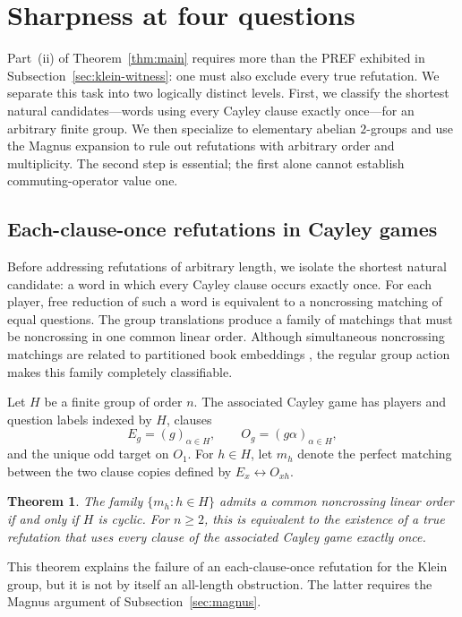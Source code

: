\documentclass[11pt]{article}
\newtheorem{theorem}{Theorem}[section]
\theoremstyle{definition}
\theoremstyle{remark}
\numberwithin{equation}{section}
\begin{document}
\section{Sharpness at four questions}\label{sec:sharpness}

Part~(ii) of Theorem~\ref{thm:main} requires more than the PREF exhibited in
Subsection~\ref{sec:klein-witness}: one must also exclude every true refutation.
We separate this task into two logically distinct levels.  First, we classify
the shortest natural candidates---words using every Cayley clause exactly
once---for an arbitrary finite group.  We then specialize to elementary
abelian \(2\)-groups and use the Magnus expansion to rule out refutations with
arbitrary order and multiplicity.  The second step is essential; the first
alone cannot establish commuting-operator value one.

\subsection{Each-clause-once refutations in Cayley games}\label{sec:cayley}

Before addressing refutations of arbitrary length, we isolate the shortest
natural candidate: a word in which every Cayley clause occurs exactly once.
For each player, free reduction of such a word is equivalent to a
noncrossing matching of equal questions.  The group translations produce a
family of matchings that must be noncrossing in one common linear order.
Although simultaneous noncrossing matchings are related to partitioned book
embeddings \cite{AkitayaEtAl2017}, the regular group action makes this family
completely classifiable.

Let \(H\) be a finite group of order \(n\).  The associated Cayley game has
players and question labels
indexed by \(H\), clauses
\[
  E_g=(g)_{\alpha\in H},
  \qquad
  O_g=(g\alpha)_{\alpha\in H},
\]
and the unique odd target on \(O_1\).  For \(h\in H\), let \(m_h\) denote
the perfect matching between the two clause copies defined by
\(E_x\leftrightarrow O_{xh}\).

\begin{theorem}
\label{thm:cayley-cyclic}
The family \(\{m_h:h\in H\}\) admits a common noncrossing linear order if
and only if \(H\) is cyclic.  For \(n\geq2\), this is equivalent to the
existence of a true refutation that uses every clause of the associated
Cayley game exactly once.
\end{theorem}

This theorem explains the failure of an each-clause-once refutation for the
Klein group, but it is not by itself an all-length obstruction.  The latter
requires the Magnus argument of Subsection~\ref{sec:magnus}.
\end{document}
